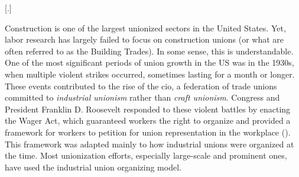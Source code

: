 \documentclass[12pt]{article}
\newlength{\myindent}
\begin{document}
\newpage

\tableofcontents
\newpage

\listoffigures
\newpage

[.\hspace{0.5em}]

\titlespacing*{\section}{0pt}{0pt}{0pt} %
\titlespacing*{\subsection}{0pt}{0pt}{0pt}
\titlespacing*{\subsubsection}{0pt}{0pt}{1em}



Construction is one of the largest unionized sectors in the United States. Yet, labor research has largely failed to focus on construction unions (or what are often referred to as the Building Trades). In some sense, this is understandable. One of the most significant periods of union growth in the US was in the 1930s, when multiple violent strikes occurred, sometimes lasting for a month or longer. These events contributed to the rise of the \acrfull{cio}, a federation of trade unions committed to \emph{industrial unionism} rather than \emph{craft unionism}. Congress and President Franklin D. Roosevelt responded to these violent battles by enacting the Wager Act, which guaranteed workers the right to organize and provided a framework for workers to petition for union representation in the workplace (\cite{grossMakingNationalLabor1974}). This framework was adapted mainly to how industrial unions were organized at the time. Most unionization efforts, especially large-scale and prominent ones, have used the industrial union organizing model.
\end{document}
